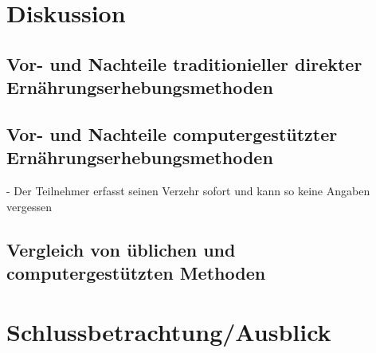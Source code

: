 \section{Diskussion}

\subsection{Vor- und Nachteile traditionieller direkter Ernährungserhebungsmethoden}


\subsection{Vor- und Nachteile computergestützter Ernährungserhebungsmethoden}

- Der Teilnehmer erfasst seinen Verzehr sofort und kann so keine Angaben vergessen 
\subsection{Vergleich von üblichen und computergestützten Methoden}



\section{Schlussbetrachtung/Ausblick}
